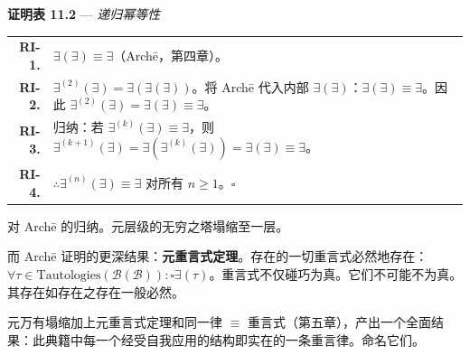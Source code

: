 \documentclass[10pt, openany, oneside]{book}
\renewcommand{\footnotesize}{\fontsize{8.5}{11}\selectfont}
\begin{document}
\textbf{证明表 11.2} --- \textit{递归幂等性}

\vspace{0.5em}

{\footnotesize
\noindent\begin{tabular}{r p{}}
\textbf{RI-1.} & $\exists(\exists) \equiv \exists$（Arch\={e}，第四章）。\\[0.3em]
\textbf{RI-2.} & $\exists^{(2)}(\exists) = \exists(\exists(\exists))$。将 Arch\={e} 代入内部 $\exists(\exists)$：$\exists(\exists) \equiv \exists$。因此 $\exists^{(2)}(\exists) = \exists(\exists) \equiv \exists$。\\[0.3em]
\textbf{RI-3.} & 归纳：若 $\exists^{(k)}(\exists) \equiv \exists$，则 $\exists^{(k+1)}(\exists) = \exists(\exists^{(k)}(\exists)) = \exists(\exists) \equiv \exists$。\\[0.3em]
\textbf{RI-4.} & $\therefore \exists^{(n)}(\exists) \equiv \exists$ 对所有 $n \geq 1$。$\square$ \\[0.3em]
\end{tabular}
}

\vspace{0.8em}

\noindent 对 Arch\={e} 的归纳。元层级的无穷之塔塌缩至一层。

而 Arch\={e} 证明的更深结果：\textbf{元重言式定理}。存在的一切重言式必然地存在：$\forall \tau \in \text{Tautologies}(\mathcal{B}(\mathcal{B})): \square\exists(\tau)$。重言式不仅碰巧为真。它们不可能不为真。其存在如存在之存在一般必然。

元万有塌缩加上元重言式定理和同一律 $\equiv$ 重言式（第五章），产出一个全面结果：此典籍中每一个经受自我应用的结构即实在的一条重言律。命名它们。

\vspace{0.5em}
\end{document}
